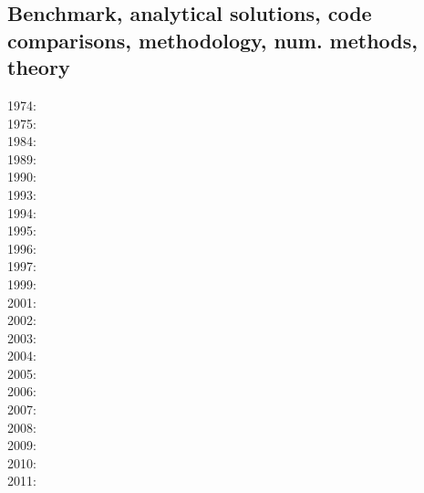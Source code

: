 \subsection{Benchmark, analytical solutions, code comparisons, methodology, num. methods, theory}

\noindent
{\scriptsize
1974: \cite{hiac74}\\
1975: \cite{waki75a}\cite{waki75b}\\
1984: \cite{yusa84}\cite{smol84}\\
1989: \cite{blbc89}\\
1990: \cite{trab90}\\
1993: \cite{leka93}\\
1994: \cite{brsa94}\\
1995: \cite{brsa95}\cite{moso95}\cite{full95}\\
1996: \cite{zhon96}\cite{mozg96}\\
1997: \cite{rist97}\\
1999: \cite{lind99}\cite{bird99}\\
2001: \cite{modm01}\cite{vank01}\\
2002: \cite{mudm02}\\
2003: \cite{taki03}\cite{modm03}\cite{geyu03}\cite{geyu03b}\cite{taxi03}\cite{scpo03}\\
2004: \cite{kaps04}\cite{kasa04}\cite{kaks08}\cite{mumc04}\\
2005: \cite{mure05}\\
2006: \cite{kapo06}\cite{more06}\cite{onmm06}\cite{mudm06}\cite{tact06}\\
2007: \cite{toma07}\cite{chcc07}\cite{kabe07}\cite{kaks07}\cite{moql07}\cite{geyu07}\cite{dadh07}
      \cite{zldf07}\\
2008: \cite{zhmt08}\cite{deka08}\cite{trub08}\cite{krdp08}\cite{mamo08}\cite{gepd98}
      \cite{vack08}\cite{heta08}\cite{brtf08}\cite{daks08}\cite{chzy08}\cite{tack08}\cite{hust08b}\\
2009: \cite{king09}\cite{geum09}\cite{vemm09}\cite{qurj09}\\
2010: \cite{kaus10}\cite{kamm10}\cite{egat10}\cite{kilv10}\\
2011: \cite{dumg11}\cite{uibb11}\cite{hegc11}\cite{muso11}\cite{dawk11}\cite{lemm11}\\
}
